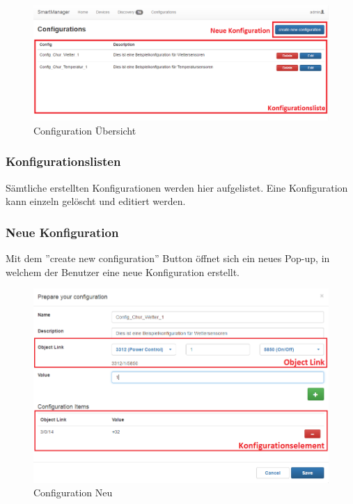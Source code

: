 \begin{figure}[H]
\centering
\includegraphics[scale=0.57]{../04_Realisierung/images/userinterface/config_overview.png}
\caption{Configuration Übersicht}
\end{figure}

\subsubsection{Konfigurationslisten}
Sämtliche erstellten Konfigurationen werden hier aufgelistet. Eine Konfiguration kann einzeln gelöscht und editiert werden.

\subsubsection{Neue Konfiguration}
Mit dem ''create new configuration'' Button öffnet sich ein neues Pop-up, in welchem der Benutzer eine neue Konfiguration erstellt.

\begin{figure}[H]
\centering
\includegraphics[scale=0.57]{../04_Realisierung/images/userinterface/config.png}
\caption{Configuration Neu}
\end{figure}

